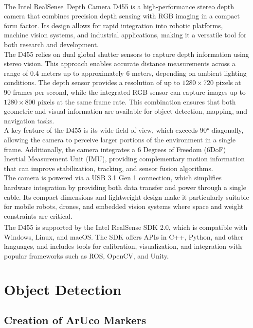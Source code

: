 The Intel\textsuperscript{\textregistered} RealSense\texttrademark\ Depth Camera D455 is a high-performance stereo depth camera that combines precision depth sensing with RGB imaging in a compact form factor. 
Its design allows for rapid integration into robotic platforms, machine vision systems, and industrial applications, making it a versatile tool for both research and development.
\\
The D455 relies on dual global shutter sensors to capture depth information using stereo vision. 
This approach enables accurate distance measurements across a range of 0.4 meters up to approximately 6 meters, depending on ambient lighting conditions. 
The depth sensor provides a resolution of up to $1280 \times 720$ pixels at 90 frames per second, while the integrated RGB sensor can capture images up to $1280 \times 800$ pixels at the same frame rate. 
This combination ensures that both geometric and visual information are available for object detection, mapping, and navigation tasks.
\\
A key feature of the D455 is its wide field of view, which exceeds 90° diagonally, allowing the camera to perceive larger portions of the environment in a single frame. 
Additionally, the camera integrates a 6 Degrees of Freedom (6DoF) Inertial Measurement Unit (IMU), providing complementary motion information that can improve stabilization, tracking, and sensor fusion algorithms.
\\
The camera is powered via a USB 3.1 Gen 1 connection, which simplifies hardware integration by providing both data transfer and power through a single cable. 
Its compact dimensions and lightweight design make it particularly suitable for mobile robots, drones, and embedded vision systems where space and weight constraints are critical.
\\
The D455 is supported by the Intel\textsuperscript{\textregistered} RealSense SDK 2.0, which is compatible with Windows, Linux, and macOS. 
The SDK offers APIs in C++, Python, and other languages, and includes tools for calibration, visualization, and integration with popular frameworks such as ROS, OpenCV, and Unity. 


\section{Object Detection}

\subsection{Creation of ArUco Markers}

